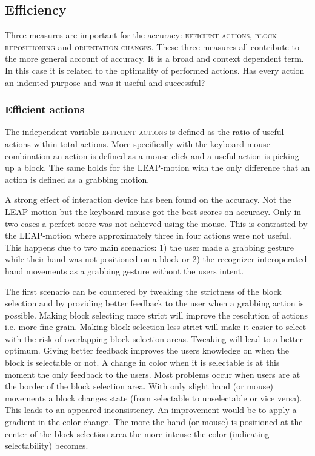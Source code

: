 \subsection{Efficiency}

Three measures are important for the accuracy: \textsc{efficient actions}, \textsc{block repositioning} and \textsc{orientation changes}. These three measures all contribute to the more general account of accuracy. It is a broad and context dependent term. In this case it is related to the optimality of performed actions. Has every action an indented purpose and was it useful and successful?

\subsubsection{Efficient actions}
The independent variable \textsc{efficient actions } is defined as the ratio of useful actions within total actions. More specifically with the keyboard-mouse combination an action is defined as a mouse click and a useful action is picking up a block. The same holds for the LEAP-motion with the only difference that an action is defined as a grabbing motion.

A strong effect of interaction device has been found on the accuracy. Not the LEAP-motion but the keyboard-mouse got the best scores on accuracy. Only in two cases a perfect score was not achieved using the mouse. This is contrasted by the LEAP-motion where approximately three in four actions were not useful. This happens due to two main scenarios: 1) the user made a grabbing gesture while their hand was not positioned on a block or 2) the recognizer interoperated hand movements as a grabbing gesture without the users intent.  

The first scenario can be countered by tweaking the strictness of the block selection and by providing better feedback to the user when a grabbing action is possible. Making block selecting more strict will improve the resolution of actions i.e. more fine grain. Making block selection less strict will make it easier to select with the risk of overlapping block selection areas. Tweaking will lead to a better optimum. Giving better feedback improves the users knowledge on when the block is selectable or not. A change in color when it is selectable is at this moment the only feedback to the users. Most problems occur when users are at the border of the block selection area. With only slight hand (or mouse) movements a block changes state (from selectable to unselectable or vice versa). This leads to an appeared inconsistency. An improvement would be to apply a gradient in the color change. The more the hand (or mouse) is positioned at the center of the block selection area the more intense the color (indicating selectability) becomes. 

